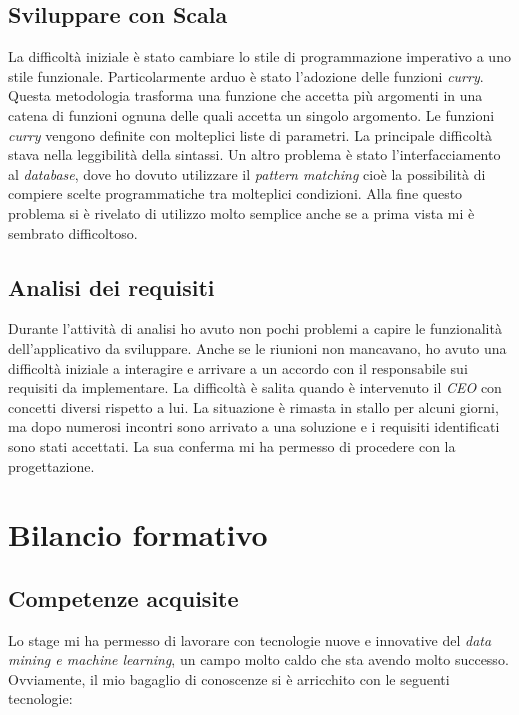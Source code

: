 \subsection*{Sviluppare con Scala}
La difficoltà iniziale è stato cambiare lo stile di programmazione imperativo a uno stile funzionale.
Particolarmente arduo è stato l'adozione delle funzioni \textit{curry}. Questa metodologia trasforma una funzione che accetta più argomenti in una catena di funzioni ognuna delle quali accetta un singolo argomento. Le funzioni \textit{curry} vengono definite con molteplici liste di parametri. La principale difficoltà stava nella leggibilità della sintassi. Un altro problema è stato l'interfacciamento al \textit{database}, dove ho dovuto utilizzare il \textit{pattern matching} cioè la possibilità di compiere scelte programmatiche tra molteplici condizioni. Alla fine questo problema si è rivelato di utilizzo molto semplice anche se a prima vista mi è sembrato difficoltoso.

\subsection*{Analisi dei requisiti}
Durante l'attività di analisi ho avuto non pochi problemi a capire le funzionalità dell'applicativo da sviluppare. Anche se le riunioni non mancavano, ho avuto una difficoltà iniziale a interagire e arrivare a un accordo con il responsabile sui requisiti da implementare. La difficoltà è salita quando è intervenuto il \textit{CEO} con concetti diversi rispetto a lui. La situazione è rimasta in stallo per alcuni giorni, ma dopo numerosi incontri sono arrivato a una soluzione e i requisiti identificati sono stati accettati. La sua conferma mi ha permesso di procedere con la progettazione.




\section{Bilancio formativo}

\subsection{Competenze acquisite}
Lo stage mi ha permesso di lavorare con tecnologie nuove e innovative del \textit{data mining e machine learning}, un campo molto caldo che sta avendo molto successo. Ovviamente, il mio bagaglio di conoscenze si è arricchito con le seguenti tecnologie:

